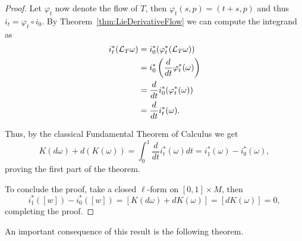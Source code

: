 \begin{proof}
  Let $\varphi_t$ now denote the flow of $T$, then $\varphi_t(s, p) = (t+s, p)$ and thus $i_t = \varphi_t \circ i_0$.
  By Theorem~\ref{thm:LieDerivativeFlow} we can compute the integrand as
  \begin{align}
    i_t^*(\mathcal{L}_T\omega) &= i^*_0(\varphi_t^*(\mathcal{L}_T\omega)) \\
    &= i_0^*\left(\frac{d}{dt} \varphi_t^*(\omega)\right) \\
    &= \frac{d}{dt} i_0^*(\varphi_t^*(\omega)) \\
    &= \frac{d}{dt} i_t^*(\omega).
  \end{align}

  Thus, by the classical Fundamental Theorem of Calculus we get
  \begin{equation}
  K(d\omega) + d(K(\omega)) = \int_0^1 \frac{d}{dt} i_t^*(\omega) dt = i_1^*(\omega) - i_0^*(\omega),
  \end{equation}
  proving the first part of the theorem.

  To conclude the proof, take a closed $\ell$-form on $[0,1]\times M$, then
  \begin{equation}
    i_1^*([w]) - i_0^*([w]) = [K(d\omega) + dK(\omega)] = [dK(\omega)] =0,
  \end{equation}
  completing the proof.
\end{proof}

An important consequence of this result is the following theorem.

